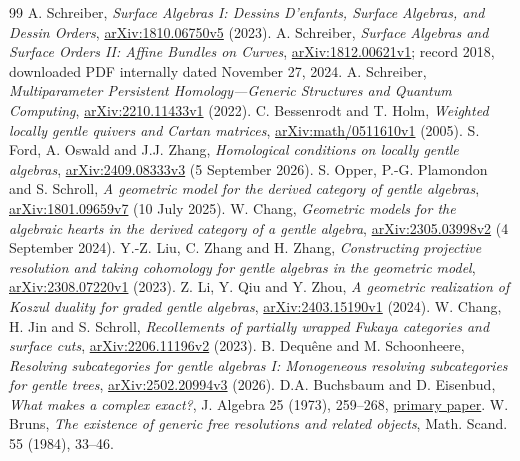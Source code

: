 \documentclass[11pt,oneside,openany]{book}
\theoremstyle{definition}\newtheorem{definition}[theorem]{Definition}
\theoremstyle{remark}\newtheorem{remark}[theorem]{Remark}
\begin{document}
\begin{thebibliography}{99}
 A. Schreiber, \emph{Surface Algebras I: Dessins D'enfants, Surface Algebras, and Dessin Orders}, \href{https://arxiv.org/abs/1810.06750v5}{arXiv:1810.06750v5} (2023).
 A. Schreiber, \emph{Surface Algebras and Surface Orders II: Affine Bundles on Curves}, \href{https://arxiv.org/abs/1812.00621v1}{arXiv:1812.00621v1}; record 2018, downloaded PDF internally dated November 27, 2024.
 A. Schreiber, \emph{Multiparameter Persistent Homology---Generic Structures and Quantum Computing}, \href{https://arxiv.org/abs/2210.11433v1}{arXiv:2210.11433v1} (2022).
 C. Bessenrodt and T. Holm, \emph{Weighted locally gentle quivers and Cartan matrices}, \href{https://arxiv.org/abs/math/0511610v1}{arXiv:math/0511610v1} (2005).
 S. Ford, A. Oswald and J.J. Zhang, \emph{Homological conditions on locally gentle algebras}, \href{https://arxiv.org/abs/2409.08333v3}{arXiv:2409.08333v3} (5 September 2026).
 S. Opper, P.-G. Plamondon and S. Schroll, \emph{A geometric model for the derived category of gentle algebras}, \href{https://arxiv.org/abs/1801.09659v7}{arXiv:1801.09659v7} (10 July 2025).
 W. Chang, \emph{Geometric models for the algebraic hearts in the derived category of a gentle algebra}, \href{https://arxiv.org/abs/2305.03998v2}{arXiv:2305.03998v2} (4 September 2024).
 Y.-Z. Liu, C. Zhang and H. Zhang, \emph{Constructing projective resolution and taking cohomology for gentle algebras in the geometric model}, \href{https://arxiv.org/abs/2308.07220v1}{arXiv:2308.07220v1} (2023).
 Z. Li, Y. Qiu and Y. Zhou, \emph{A geometric realization of Koszul duality for graded gentle algebras}, \href{https://arxiv.org/abs/2403.15190v1}{arXiv:2403.15190v1} (2024).
 W. Chang, H. Jin and S. Schroll, \emph{Recollements of partially wrapped Fukaya categories and surface cuts}, \href{https://arxiv.org/abs/2206.11196v2}{arXiv:2206.11196v2} (2023).
 B. Dequ\^ene and M. Schoonheere, \emph{Resolving subcategories for gentle algebras I: Monogeneous resolving subcategories for gentle trees}, \href{https://arxiv.org/abs/2502.20994v3}{arXiv:2502.20994v3} (2026).
 D.A. Buchsbaum and D. Eisenbud, \emph{What makes a complex exact?}, J. Algebra 25 (1973), 259--268, \href{https://eisenbud.github.io/papers/pdfs/1973-002.pdf}{primary paper}.
 W. Bruns, \emph{The existence of generic free resolutions and related objects}, Math. Scand. 55 (1984), 33--46.

\end{thebibliography}
\end{document}
